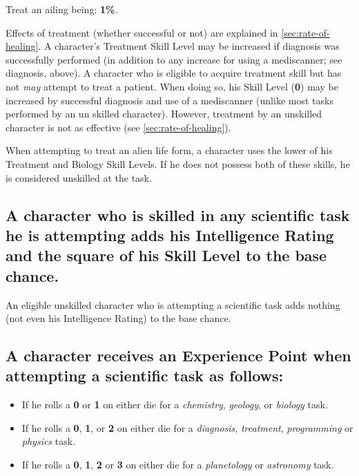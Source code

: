\begin{tasklist}
\item Treat an ailing being: \textbf{1\%}.
\end{tasklist}

Effects of treatment (whether successful or not) are explained in
\ref{sec:rate-of-healing}.  A character's Treatment Skill Level may be
increased if diagnosis was successfully performed (in addition to any
increase for using a mediscanner; see diagnosis, above).  A character
who is eligible to acquire treatment skill but has not \emph{may}
attempt to treat a patient.  When doing so, his Skill Level
(\textbf{0}) may be increased by successful diagnosis and use of a
mediscanner (unlike most tasks performed by an un skilled character).
However, treatment by an unskilled character is not as effective (see
\ref{sec:rate-of-healing}).

When attempting to treat an alien life form, a character uses the
lower of his Treatment and Biology Skill Levels.  If he does not
possess both of these skills, he is considered unskilled at the task.

\subsection[Additions To Base Chance]{A character who is skilled in
  any scientific task he is attempting adds his Intelligence Rating
  and the square of his Skill Level to the base chance.}
\label{sec:sci-skills-add-base-chance}

An eligible unskilled character who is attempting a scientific task
adds nothing (not even his Intelligence Rating) to the base chance.

\subsection[Experience Points]{A character receives an Experience
  Point when attempting a scientific task as follows:}
\label{sec:sci-skills-ep}

\begin{itemize}
\item If he rolls a \textbf{0} or \textbf{1} on either die for a
  \emph{chemistry}, \emph{geology}, or \emph{biology} task.
\item If he rolls a \textbf{0}, \textbf{1}, or \textbf{2} on either
  die for a \emph{diagnosis}, \emph{treatment}, \emph{programming} or
  \emph{physics} task.
\item If he rolls a \textbf{0}, \textbf{1}, \textbf{2} or \textbf{3}
  on either die for a \emph{planetology} or \emph{astronomy} task.
\end{itemize}

